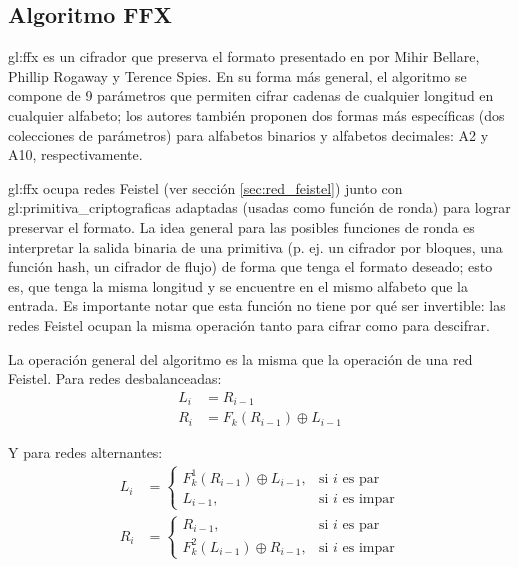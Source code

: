 %
%

\subsection{Algoritmo FFX}
\label{sec:ffx}

\Gls{gl:ffx} es un cifrador que preserva el formato presentado en \cite{ffx_1}
por Mihir Bellare, Phillip Rogaway y Terence Spies.  En su forma más general,
el algoritmo se compone de 9 parámetros que permiten cifrar cadenas de
cualquier longitud en cualquier alfabeto; los autores también proponen dos
formas más específicas (dos colecciones de parámetros) para alfabetos binarios
y alfabetos decimales: A2 y A10, respectivamente.

\Gls{gl:ffx} ocupa redes Feistel (ver sección \ref{sec:red_feistel}) junto con
\glspl{gl:primitiva_criptografica} adaptadas (usadas como función de ronda) para
lograr preservar el formato. La idea general para las posibles funciones de
ronda es interpretar la salida binaria de una primitiva (p. ej. un cifrador por
bloques, una función hash, un cifrador de flujo) de forma que tenga el formato
deseado; esto es, que tenga la misma longitud y se encuentre en el mismo
alfabeto que la entrada. Es importante notar que esta función no tiene por qué
ser invertible: las redes Feistel ocupan la misma operación tanto para cifrar
como para descifrar.

La operación general del algoritmo es la misma que la operación de una red
Feistel. Para redes desbalanceadas:
\begin{equation}
  \begin{split}
    L_{i} &= R_{i - 1} \\
    R_{i} &= F_k(R_{i - 1}) \oplus L_{i - 1}
  \end{split}
\end{equation}

Y para redes alternantes:
\begin{equation}
  \begin{split}
    L_{i} &=
    \begin{cases}
      F^1_k(R_{i - 1}) \oplus L_{i - 1},  & \text{si } i \text{ es par} \\
      L_{i - 1},                          & \text{si } i \text{ es impar}
    \end{cases}
    \\
    R_{i} &=
    \begin{cases}
      R_{i - 1},                          & \text{si } i \text{ es par} \\
      F^2_k(L_{i - 1}) \oplus R_{i - 1},  & \text{si } i \text{ es impar}
    \end{cases}
  \end{split}
\end{equation}

